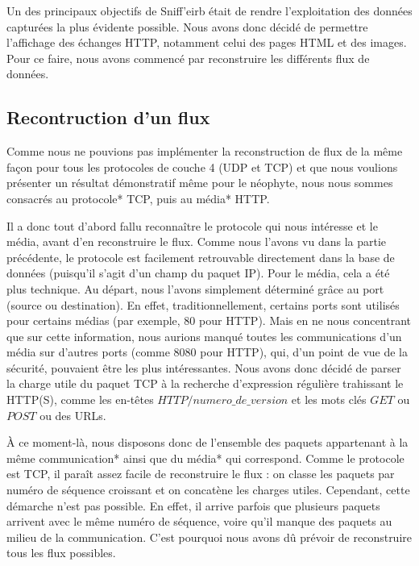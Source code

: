 Un des principaux objectifs de Sniff'eirb était de rendre l'exploitation des données capturées la plus évidente possible.
Nous avons donc décidé de permettre l'affichage des échanges HTTP, notamment celui des pages HTML et des images. Pour ce
faire, nous avons commencé par reconstruire les différents flux de données.

\subsection{Recontruction d'un flux}

Comme nous ne pouvions pas implémenter la reconstruction de flux de la même façon pour tous les protocoles de couche 4 (UDP et TCP) et
que nous voulions présenter un résultat démonstratif même pour le néophyte, nous nous sommes consacrés au protocole* TCP, puis au média* HTTP.


\indent Il a donc tout d'abord fallu reconnaître le protocole qui nous intéresse et le média, avant d'en reconstruire le flux. Comme nous l'avons vu 
dans la partie précédente, le protocole est facilement retrouvable directement dans la base de données (puisqu'il s'agit d'un champ du paquet IP). 
Pour le média, cela a été plus technique. Au départ, nous l'avons simplement déterminé grâce au port (source ou destination). En effet, traditionnellement,
certains ports sont utilisés pour certains médias (par exemple, 80 pour HTTP). Mais en ne nous concentrant que sur cette information, nous aurions manqué
toutes les communications d'un média sur d'autres ports (comme 8080 pour HTTP), qui, d'un point de vue de la sécurité, pouvaient être les plus intéressantes.
Nous avons donc décidé de parser la charge utile du paquet TCP à la recherche d'expression régulière trahissant le HTTP(S), comme les en-têtes
 $HTTP/numero\_de\_version$ et les mots clés $GET$ ou $POST$ ou des URLs.


\indent À ce moment-là, nous disposons donc de l'ensemble des paquets appartenant à la même communication* ainsi que du média* qui correspond. Comme le protocole est TCP,
il paraît assez facile de reconstruire le flux : on classe les paquets par numéro de séquence croissant et on concatène les charges utiles. Cependant, cette démarche 
n'est pas possible. En effet, il arrive parfois que plusieurs paquets arrivent avec le même numéro de séquence, voire qu'il manque des paquets au milieu de la communication.
C'est pourquoi nous avons dû prévoir de reconstruire tous les flux possibles.


